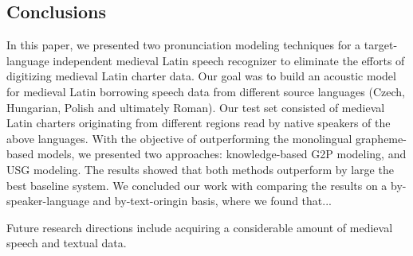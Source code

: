 \documentclass[runningheads,a4paper]{llncs}
\begin{document}
\subsection{Conclusions}
In this paper, we presented two pronunciation modeling techniques for a target-language independent medieval Latin speech recognizer to eliminate the efforts of digitizing medieval Latin charter data.
Our goal was to build an acoustic model for medieval Latin borrowing speech data from different source languages (Czech, Hungarian, Polish and ultimately Roman).
Our test set consisted of medieval Latin charters originating from different regions read by native speakers of the above languages.
With the objective of outperforming the monolingual grapheme-based models, we presented two approaches: knowledge-based G2P modeling, and USG modeling.
The results showed that both methods outperform by large the best baseline system. 
We concluded our work with comparing the results on a by-speaker-language and by-text-oringin basis, where we found that...

Future research directions include acquiring a considerable amount of medieval speech and textual data.



\end{document}
